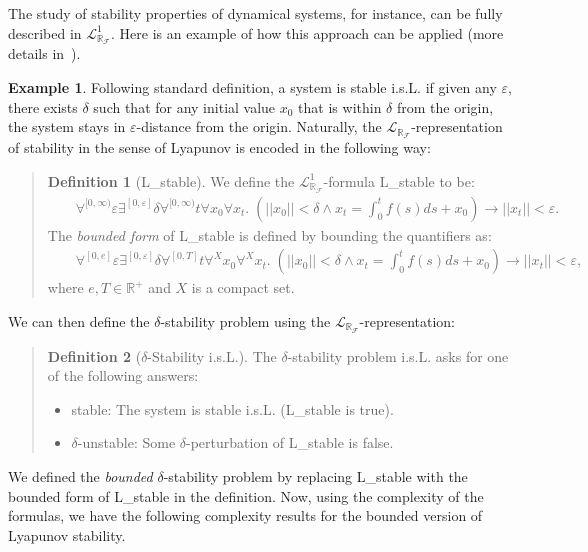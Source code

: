 \documentclass[11pt]{article}
\newcommand{\lrf}{\mathcal{L}_{\mathbb{R}_{\mathcal{F}}}}
\theoremstyle{definition}
\newtheorem{definition}{Definition}[section]
\newtheorem{example}{Example}[section]
\begin{document}
The study of stability properties of dynamical systems, for instance, can be fully described in $\lrf^1$. Here is an example of how this approach can be applied (more details in~\cite{DBLP:journals/corr/GaoKC14}). 
\begin{example}
Following standard definition, a system is stable i.s.L. if given any $\varepsilon$, there exists $\delta$ such that for any initial value $x_0$ that is within $\delta$ from the origin, the system stays in $\varepsilon$-distance from the origin. Naturally, the $\lrf$-representation of stability in the sense of Lyapunov is encoded in the following way:
\begin{quote}
\vspace{-.5cm}
\begin{definition}[{\sf L\_stable}]
We define the $\lrf^1$-formula {\sf L\_stable} to be:
\begin{eqnarray*}
& &\forall^{[0,\infty)} \varepsilon\exists^{[0,\varepsilon]} \delta \forall^{[0,\infty)} t\forall x_0\forall x_t .\; (||x_0||<\delta \wedge x_t = \int_0^t f(s)ds + x_0 )\rightarrow ||x_t||<\varepsilon.
\end{eqnarray*}
The {\em bounded form} of {\sf L\_stable} is defined by bounding the quantifiers as:\begin{eqnarray*}
& &\forall^{[0, e]} \varepsilon\exists^{[0,\varepsilon]} \delta \forall^{[0,T]} t\forall^X x_0\forall^X x_t. \;(||x_0||<\delta \wedge x_t = \int_0^t f(s)ds + x_0 )\rightarrow ||x_t||<\varepsilon, 
\end{eqnarray*}
where $e, T\in \mathbb{R}^+$ and $X$ is a compact set.
\end{definition}
\end{quote}
We can then define the $\delta$-stability problem using the $\lrf$-representation:  
\begin{quote}
\vspace{-.5cm}
\begin{definition}[$\delta$-Stability i.s.L.]\label{sl}
The $\delta$-stability problem i.s.L. asks for one of the following answers:
\begin{itemize}
\item {\sf stable}: The system is stable i.s.L. ({\sf L\_stable} is true). 
\item {\sf $\delta$-unstable}: Some $\delta$-perturbation of {\sf L\_stable} is false. 
\end{itemize}
\end{definition}
\end{quote}
We defined the {\em bounded} $\delta$-stability problem by replacing {\sf L\_stable} with the bounded form of {\sf L\_stable} in the definition. Now, using the complexity of the formulas, we have the following complexity results for the bounded version of Lyapunov stability. 

\end{example}
\end{document}
